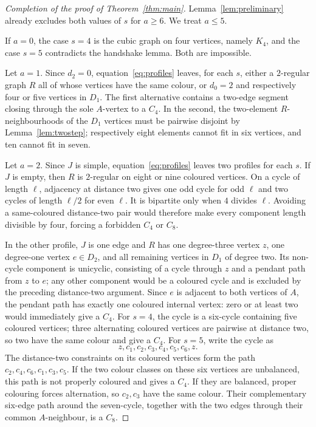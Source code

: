 \documentclass[11pt]{article}
\begin{document}
\begin{proof}[Completion of the proof of Theorem~\ref{thm:main}]
Lemma~\ref{lem:preliminary} already excludes both values of $s$ for
$a\ge6$.  We treat $a\le5$.

If $a=0$, the case $s=4$ is the cubic graph on four vertices, namely $K_4$,
and the case $s=5$ contradicts the handshake lemma.  Both are impossible.

Let $a=1$.  Since $d_2=0$, equation~\eqref{eq:profiles} leaves, for each
$s$, either a $2$-regular graph $R$ all of whose vertices have the same
colour, or $d_0=2$ and respectively four or five vertices in $D_1$.  The
first alternative contains a two-edge segment closing through the sole
$A$-vertex to a $C_4$.  In the second, the two-element $R$-neighbourhoods of
the $D_1$ vertices must be pairwise disjoint by
Lemma~\ref{lem:twostep}; respectively eight elements cannot fit in six
vertices, and ten cannot fit in seven.

Let $a=2$.  Since $J$ is simple, equation~\eqref{eq:profiles} leaves two
profiles for each $s$.  If $J$ is empty, then $R$ is $2$-regular on eight
or nine coloured vertices.  On a cycle of length $\ell$, adjacency at
distance two gives one odd cycle for odd $\ell$ and two cycles of length
$\ell/2$ for even $\ell$.  It is bipartite only when $4$ divides $\ell$.
Avoiding a same-coloured distance-two pair would therefore make every
component length divisible by four, forcing a forbidden $C_4$ or $C_8$.

In the other profile, $J$ is one edge and $R$ has one degree-three vertex
$z$, one degree-one vertex $e\in D_2$, and all remaining vertices in $D_1$
of degree two.  Its non-cycle component is unicyclic, consisting of a cycle
through $z$ and a pendant path from $z$ to $e$; any other component would be
a coloured cycle and is excluded by the preceding distance-two argument.
Since $e$ is adjacent to both vertices of $A$, the pendant path has exactly
one coloured internal vertex: zero or at least two would immediately give a
$C_4$.  For $s=4$, the cycle is a six-cycle containing five coloured
vertices; three alternating coloured vertices are pairwise at distance two,
so two have the same colour and give a $C_4$.  For $s=5$, write the cycle as
\[
 z,c_1,c_2,c_3,c_4,c_5,c_6,z.
\]
The distance-two constraints on its coloured vertices form the path
$c_2,c_4,c_6,c_1,c_3,c_5$.  If the two colour classes on these six vertices
are unbalanced, this path is not properly coloured and gives a $C_4$.  If
they are balanced, proper colouring forces alternation, so $c_2,c_3$ have
the same colour.  Their complementary six-edge path around the seven-cycle,
together with the two edges through their common $A$-neighbour, is a
$C_8$.


\end{proof}
\end{document}
